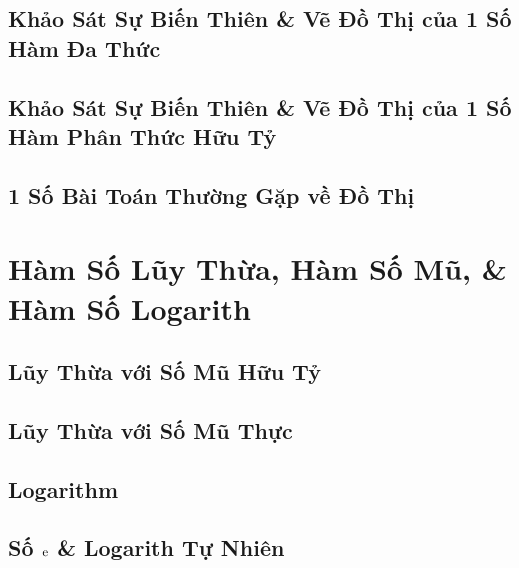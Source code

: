 \documentclass[oneside]{book}
\numberwithin{equation}{section}
\begin{document}

\section{Khảo Sát Sự Biến Thiên \& Vẽ Đồ Thị của 1 Số Hàm Đa Thức}


\section{Khảo Sát Sự Biến Thiên \& Vẽ Đồ Thị của 1 Số Hàm Phân Thức Hữu Tỷ}


\section{1 Số Bài Toán Thường Gặp về Đồ Thị}


\chapter{Hàm Số Lũy Thừa, Hàm Số Mũ, \& Hàm Số Logarith}

\section{Lũy Thừa với Số Mũ Hữu Tỷ}


\section{Lũy Thừa với Số Mũ Thực}


\section{Logarithm}


\section{Số $\rm e$ \& Logarith Tự Nhiên}
\end{document}
